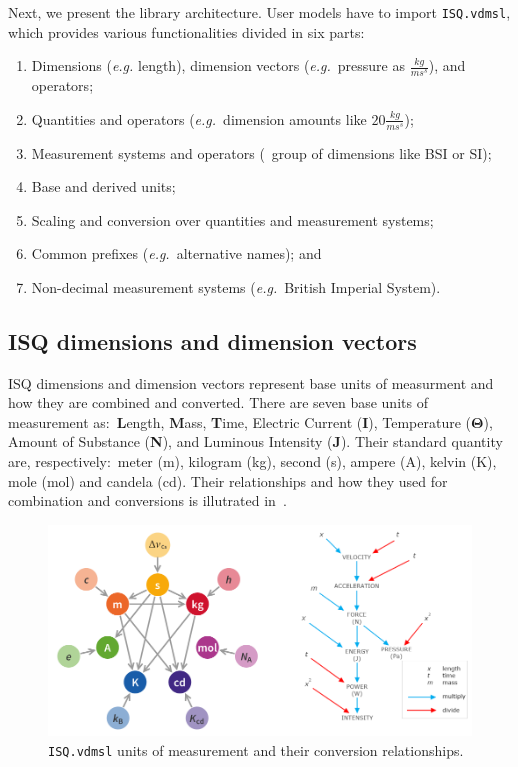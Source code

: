 \documentclass[runningheads,a4paper]{llncs}
\begin{document}
Next, we present the library architecture. User models have to import \texttt{ISQ.vdmsl}, which provides various functionalities divided in six parts: 
%
\begin{enumerate}
    \item Dimensions (\textit{e.g.} length), dimension vectors (\textit{e.g.}~pressure as \(\frac{kg}{ms^s}\)), and operators;
    \item Quantities and operators (\textit{e.g.}~dimension amounts like \(20\frac{kg}{ms^s}\));
    \item Measurement systems and operators (~group of dimensions like BSI or SI); 
    \item Base and derived units;
    \item Scaling and conversion over quantities and measurement systems;
    \item Common prefixes (\textit{e.g.}~alternative names); and 
    \item Non-decimal measurement systems (\textit{e.g.}~British Imperial System). 
\end{enumerate} 

 
\subsection*{ISQ dimensions and dimension vectors}

ISQ dimensions and dimension vectors represent base units of measurment and how they are combined and converted. There are seven base units of measurement as:~\textbf{L}ength, \textbf{M}ass, \textbf{T}ime, Electric Current (\textbf{I}), Temperature (\(\mathbf{\Theta}\)), Amount of Substance (\textbf{N}), and Luminous Intensity (\textbf{J}). Their standard quantity are, respectively:~meter (m), kilogram (kg), second (s), ampere (A), kelvin (K), mole (mol) and candela (cd). Their relationships and how they used for combination and conversions is illutrated in~.  

\begin{figure}[htbp]
    \centering
        \includegraphics[width=\textwidth,scale=0.4]{figures/ISQLibUnitRelationships2.png}
    \caption{\texttt{ISQ.vdmsl} units of measurement and their conversion relationships.}\label{fig:UnitRelationships}
 \end{figure}
\end{document}
